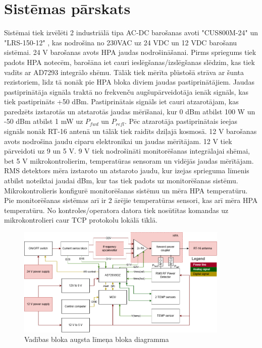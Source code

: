 \section{Sistēmas pārskats}
Sistēmai tiek izvēlēti 2 industriālā tipa AC-DC barošanas avoti "CUS800M-24" \cite{24v_industrial_ps} un "LRS-150-12" \cite{12v_industrial_ps}, kas nodrošina no 230VAC uz 24 VDC un 12 VDC barošanu sistēmai. 24 V barošanas avots HPA jaudas nodrošināšanai. Pirms spriegums tiek padots HPA notecēm, barošāna iet cauri ieslēgšanas/izslēgšanas slēdzim, kas tiek vadīts ar AD7293 integrālo shēmu. Tālāk tiek mērīta plūstošā strāva ar šunta rezistoriem, līdz tā nonāk pie HPA bloka diviem jaudas pastiprinātājiem. Jaudas pastiprinātāja signāla traktā no frekvenču augšupārveidotāja ienāk signāls, kas tiek pastiprināts +50 dBm. Pastiprinātais signāls iet cauri atzarotājam, kas paredzēts izstarotās un atstarotās jaudas mērīšanai, kur 0 dBm atbilst 100 W un -50 dBm atbilst 1 mW uz $P_{fwd}$ un $P_{refl}$. Pēc atzarotāja pastiprinātais ieejas signāls nonāk RT-16 antenā un tālāk tiek raidīts dziļajā kosmosā. 12 V barošanas avots nodrošina jaudu ciparu elektronikai un jaudas mērītājam. 12 V tiek pārveidoti uz 9 un 5 V. 9 V tiek nodrošināti monitorēšanas integrālajai shēmai, bet 5 V mikrokontrolierim, temperatūras sensoram un vidējās jaudas mērītājam. RMS detektors mēra izstaroto un atstaroto jaudu, kur izejas sprieguma līmenis atbilst noteiktai jaudai dBm, kur tas tiek padots uz monitorēšanas sistēmu. Mikrokontrolieris konfigurē monitorēšanas sistēmu un mēra HPA temperatūru. Pie monitorēšanas sistēmas arī ir 2 ārējie temperatūras sensori, kas arī mēra HPA temperatūru. No kontroles/operatora datora tiek nosūtītas komandas uz mikrokontrolieri caur TCP protokolu lokālā tīklā.
\begin{figure}[H]
	\centering
    \includegraphics[width=0.9\textwidth]{pictures/project_diagram.png}\hspace{1cm}
    \caption{Vadības bloka augsta līmeņa bloka diagramma}
\end{figure}

